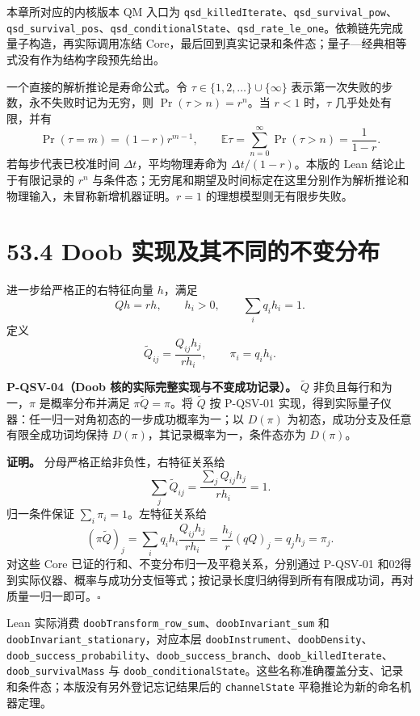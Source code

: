 \documentclass[
  11pt,
  oneside]{book}
\begin{document}
本章所对应的内核版本 QM 入口为
\texttt{qsd\_\allowbreak killed\allowbreak Iterate}、\allowbreak \texttt{qsd\_\allowbreak survival\_\allowbreak pow}、\allowbreak \texttt{qsd\_\allowbreak survival\_\allowbreak pos}、\allowbreak \texttt{qsd\_\allowbreak conditional\allowbreak State}、\allowbreak \texttt{qsd\_\allowbreak rate\_\allowbreak le\_\allowbreak one}。依赖链先完成量子构造，再实际调用冻结
Core，最后回到真实记录和条件态；量子---经典相等式没有作为结构字段预先给出。

一个直接的解析推论是寿命公式。令 \(\tau\in\{1,2,\ldots\}\cup\{\infty\}\)
表示第一次失败的步数，永不失败时记为无穷，则 \(\Pr(\tau>n)=r^n\)。当
\(r<1\) 时，\(\tau\) 几乎处处有限，并有 \[
\Pr(\tau=m)=(1-r)r^{m-1},\qquad
\mathbb E\tau=\sum_{n=0}^{\infty}\Pr(\tau>n)=\frac1{1-r}.
\] 若每步代表已校准时间 \(\Delta t\)，平均物理寿命为
\(\Delta t/(1-r)\)。本版的 Lean 结论止于有限记录的 \(r^n\)
与条件态；无穷尾和期望及时间标定在这里分别作为解析推论和物理输入，未冒称新增机器证明。\(r=1\)
的理想模型则无有限步失败。

\section{53.4 Doob 实现及其不同的不变分布}

进一步给严格正的右特征向量 \(h\)，满足 \[
Qh=rh,\qquad h_i>0,\qquad \sum_iq_ih_i=1.
\] 定义 \[
\widetilde Q_{ij}=\frac{Q_{ij}h_j}{rh_i},\qquad \pi_i=q_ih_i.
\]

\protect\hypertarget{p-qsv-04}{}{}

\textbf{P-QSV-04（Doob 核的实际完整实现与不变成功记录）。}
\(\widetilde Q\) 非负且每行和为一，\(\pi\) 是概率分布并满足
\(\pi\widetilde Q=\pi\)。将 \(\widetilde Q\) 按 P-QSV-01
实现，得到实际量子仪器：任一归一对角初态的一步成功概率为一；以
\(D(\pi)\) 为初态，成功分支及任意有限全成功词均保持
\(D(\pi)\)，其记录概率为一，条件态亦为 \(D(\pi)\)。

\textbf{证明。} 分母严格正给非负性，右特征关系给 \[
\sum_j\widetilde Q_{ij}=\frac{\sum_jQ_{ij}h_j}{rh_i}=1.
\] 归一条件保证 \(\sum_i\pi_i=1\)。左特征关系给 \[
(\pi\widetilde Q)_j
=\sum_iq_ih_i\frac{Q_{ij}h_j}{rh_i}
=\frac{h_j}{r}(qQ)_j=q_jh_j=\pi_j.
\] 对这些 Core 已证的行和、不变分布归一及平稳关系，分别通过 P-QSV-01
和02得到实际仪器、概率与成功分支恒等式；按记录长度归纳得到所有有限成功词，再对质量一归一即可。\(\square\)

Lean 实际消费
\texttt{doob\allowbreak Transform\_\allowbreak row\_\allowbreak sum}、\allowbreak \texttt{doob\allowbreak Invariant\_\allowbreak sum} 和
\texttt{doob\allowbreak Invariant\_\allowbreak stationary}，对应本层
\texttt{doob\allowbreak Instrument}、\allowbreak \texttt{doob\allowbreak Density}、\allowbreak \texttt{doob\_\allowbreak success\_\allowbreak probability}、\allowbreak \texttt{doob\_\allowbreak success\_\allowbreak branch}、\allowbreak \texttt{doob\_\allowbreak killed\allowbreak Iterate}、\allowbreak \texttt{doob\_\allowbreak survival\allowbreak Mass}
与
\texttt{doob\_\allowbreak conditional\allowbreak State}。这些名称准确覆盖分支、记录和条件态；本版没有另外登记忘记结果后的
\texttt{channel\allowbreak State} 平稳推论为新的命名机器定理。
\end{document}
